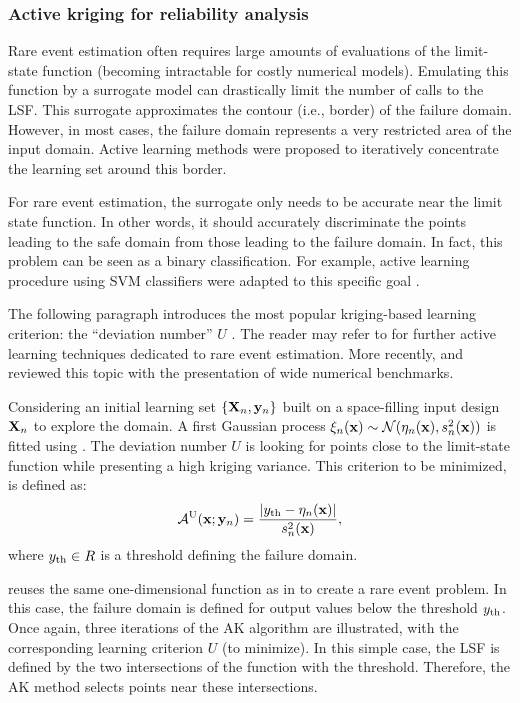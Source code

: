 \subsubsection{Active kriging for reliability analysis}
Rare event estimation often requires large amounts of evaluations of the limit-state function (becoming intractable for costly numerical models). 
Emulating this function by a surrogate model can drastically limit the number of calls to the LSF. 
This surrogate approximates the contour (i.e., border) of the failure domain. 
However, in most cases, the failure domain represents a very restricted area of the input domain. 
Active learning methods were proposed to iteratively concentrate the learning set around this border. 

For rare event estimation, the surrogate only needs to be accurate near the limit state function. 
In other words, it should accurately discriminate the points leading to the safe domain from those leading to the failure domain. 
In fact, this problem can be seen as a binary classification. 
For example, active learning procedure using SVM classifiers were adapted to this specific goal \citep{bourinet_2018}. 

The following paragraph introduces the most popular kriging-based learning criterion: the ``deviation number'' $U$ \citep{echard_2011}. 
The reader may refer to \citet{MorioBalesdent2015} for further active learning techniques dedicated to rare event estimation. 
More recently, \citet{teixeira_2021} and \citet{moustapha_ss_2022} reviewed this topic with the presentation of wide numerical benchmarks.

Considering an initial learning set $\left\{{\bf X}_n, {\bf y}_n\right\}$ built on a space-filling input design ${\bf X}_n$ to explore the domain. 
A first Gaussian process $\xi_n({\bf x}) \sim \mathcal{N}(\eta_n({\bf x}), s_n^2({\bf x}))$ is fitted using . 
The deviation number $U$ is looking for points close to the limit-state function while presenting a high kriging variance. 
This criterion to be minimized, is defined as:   
\begin{equation}
    \mathcal{A}^{\textrm{U}}({\bf x}; {\bf y}_n) = \frac{\left|y_\mathrm{th} - \eta_n({\bf x})\right|}{s_n^2({\bf x})}, 
    \label{eq:U}
\end{equation}
where $y_\mathrm{th} \in R$ is a threshold defining the failure domain. 

 reuses the same one-dimensional function as in  to create a rare event problem. 
In this case, the failure domain is defined for output values below the threshold $y_\mathrm{th}$. 
Once again, three iterations of the AK algorithm are illustrated, with the corresponding learning criterion $U$ (to minimize). 
In this simple case, the LSF is defined by the two intersections of the function with the threshold. 
Therefore, the AK method selects points near these intersections. 


